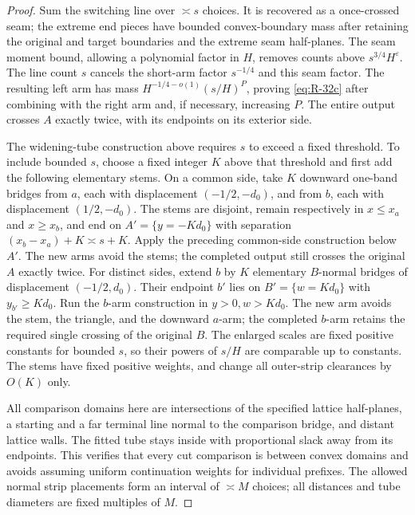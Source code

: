 \begin{proof}
Sum the switching line over \(\asymp s\) choices. It is recovered as a
once-crossed seam; the extreme end pieces have bounded convex-boundary
mass after retaining the original and target boundaries and the extreme
seam half-planes. The seam moment bound, allowing a polynomial factor in
\(H\), removes counts above \(s^{3/4}H^\varepsilon\). The line count
\(s\) cancels the short-arm factor \(s^{-1/4}\) and this seam factor.
The resulting left arm has mass
\(H^{-1/4-o(1)}(s/H)^P\), proving \eqref{eq:R-32c} after combining
with the right arm and, if necessary, increasing \(P\).
The entire output crosses \(A\) exactly twice, with its endpoints on
its exterior side.

The widening-tube construction above requires $s$ to exceed a fixed
threshold. To include bounded $s$, choose a fixed integer $K$ above that
threshold and first add the following elementary stems. On a common
side, take $K$ downward one-band bridges from $a$, each with displacement
$(-1/2,-d_0)$, and from $b$, each with displacement $(1/2,-d_0)$.
The stems are disjoint, remain respectively in $x\le x_a$ and
$x\ge x_b$, and end on $A'=\{y=-Kd_0\}$ with separation
$(x_b-x_a)+K\asymp s+K$.
Apply the preceding common-side construction below $A'$. The new arms
avoid the stems; the completed output still crosses the original $A$
exactly twice. For distinct
sides, extend $b$ by $K$ elementary $B$-normal bridges of displacement
$(-1/2,d_0)$. Their endpoint $b'$ lies on $B'=\{w=Kd_0\}$ with
$y_{b'}\ge Kd_0$. Run the $b$-arm construction in $y>0,w>Kd_0$.
The new arm avoids the stem, the triangle, and the downward $a$-arm;
the completed $b$-arm retains the required single crossing of the
original $B$. The enlarged scales
are fixed positive constants for bounded $s$, so their powers of $s/H$
are comparable up to constants. The stems have fixed positive weights,
and change all outer-strip clearances by $O(K)$ only.

All comparison domains here are intersections of the specified lattice
half-planes, a starting and a far terminal line normal to the comparison
bridge, and distant lattice walls. The fitted tube stays inside with
proportional slack away from its endpoints. This verifies that every cut
comparison is between convex domains and avoids assuming uniform
continuation weights for individual prefixes. The allowed normal strip
placements form an interval of \(\asymp M\) choices; all distances and
tube diameters are fixed multiples of \(M\).
\end{proof}

